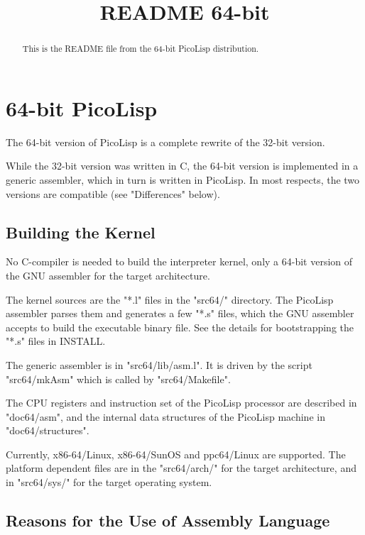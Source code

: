 \title{README 64-bit}

\maketitle


\begin{abstract}
  This is the README file from the 64-bit PicoLisp distribution. 
\end{abstract}

\section{64-bit PicoLisp}
\label{sec:64-bit-64-bit-picolisp}


The 64-bit version of PicoLisp is a complete rewrite of the 32-bit
version.

While the 32-bit version was written in C, the 64-bit version is
implemented in a generic assembler, which in turn is written in
PicoLisp. In most respects, the two versions are compatible (see
"Differences" below).


\subsection{Building the Kernel}
\label{sec:64-bit-building-the-kernel}

No C-compiler is needed to build the interpreter kernel, only a 64-bit
version of the GNU assembler for the target architecture.

The kernel sources are the "*.l" files in the "src64/" directory. The
PicoLisp assembler parses them and generates a few "*.s" files, which
the GNU assembler accepts to build the executable binary file. See the
details for bootstrapping the "*.s" files in INSTALL.

The generic assembler is in "src64/lib/asm.l". It is driven by the
script "src64/mkAsm" which is called by "src64/Makefile".

The CPU registers and instruction set of the PicoLisp processor are
described in "doc64/asm", and the internal data structures of the
PicoLisp machine in "doc64/structures".

Currently, x86-64/Linux, x86-64/SunOS and ppc64/Linux are supported. The
platform dependent files are in the "src64/arch/" for the target architecture,
and in "src64/sys/" for the target operating system.


\subsection{Reasons for the Use of Assembly Language}
\label{sec:64-bit-reasons-for-the-use-of-assembly-language}

